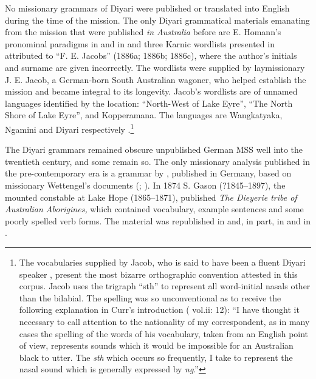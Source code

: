 No missionary grammars of Diyari were published or translated into English during the time of the mission. The only Diyari grammatical materials emanating from the mission that were published \textit{in Australia} before \citet{austin_switch_1981} are E. Homann’s pronominal paradigms in \citet[86]{taplin_1879a_nodate} and in \citet[43--44]{fraser_australian_1892} and three Karnic wordlists presented in \citet{curr_australian_1886} attributed to “F. E. Jacobs” (1886a; 1886b; 1886c), where the author’s initials and surname are given incorrectly. The wordlists were supplied by laymissionary J. E. Jacob, a German-born South Australian wagoner, who helped establish the mission and became integral to its longevity. Jacob’s wordlists are of unnamed languages identified by the location: “North-West of Lake Eyre'', “The North Shore of Lake Eyre'', and Kopperamana. The languages are Wangkatyaka, Ngamini and Diyari respectively \citep[19]{hercus_grammar_1994}.\footnote{The vocabularies supplied by Jacob, who is said to have been a fluent Diyari speaker \citep[11]{proeve_three_1946}, present the most bizarre orthographic convention attested in this corpus. Jacob uses the trigraph “sth” to represent all word-initial nasals other than the bilabial. The spelling was so unconventional as to receive the following explanation in Curr’s introduction (\citeyear{curr_australian_1886} vol.ii: 12): ``I have thought it necessary to call attention to the nationality of my correspondent, as in many cases the spelling of the words of his vocabulary, taken from an English point of view, represents sounds which it would be impossible for an Australian black to utter. The \textit{sth} which occurs so frequently, I take to represent the nasal sound which is generally expressed by \textit{ng}.''}

The Diyari grammars remained obscure unpublished German MSS well into the twentieth century, and some remain so. The only missionary analysis published in the pre-contemporary era is a grammar by \citet{planert_australische_1908}, published in Germany, based on missionary Wettengel’s documents (\citeyear{planert_australische_1908}; ). In 1874 S. Gason (?1845--1897), the mounted constable at Lake Hope (1865--1871), published \textit{The Dieyerie tribe of Australian Aborigines,} which contained vocabulary, example sentences and some poorly spelled verb forms. The material was republished in \citet{Woods1879} and, in part, in \citet{curr_australian_1886} and in \citet{fraser_australian_1892}.


